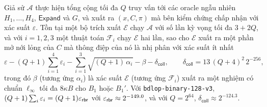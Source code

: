\begin{theorem}
\label{thm:bin-ks}
Giả sử $\mathcal A$ thực hiện tổng cộng tối đa $Q$ truy vấn tới các oracle ngẫu
nhiên $H_1,\dots,H_4$, $\mathsf{Expand}$ và $G$,
và xuất ra $(x,C,\pi)$ mà bên kiểm chứng chấp nhận với xác suất $\varepsilon$.
Tồn tại một bộ trích xuất $\mathcal E$ chạy $\mathcal A$ với số lần kỳ vọng tối
đa $3+2Q$, và với $i=1,2,3$ một thuật toán $\mathcal F_i$ chạy $\mathcal E$ hai
lần, sao cho $\mathcal E$ xuất ra một phần mở nới lỏng của $C$ mà thông điệp của
nó là nhị phân với xác suất ít nhất
\[
\varepsilon-(Q+1)\sum_{i=1}^{4}\varepsilon_i-\sum_{i=1}^{3}\sqrt{(Q+1)\,\alpha_i}
-\beta-\delta_{\mathsf{coll}},\qquad
\delta_{\mathsf{coll}}=13\,(Q+4)^2\,2^{-256},
\]
trong đó $\beta$ (tương ứng $\alpha_i$) là xác suất $\mathcal E$
(tương ứng $\mathcal F_i$) xuất ra một nghiệm \MSIS{} có chuẩn $\ell_\infty$ tối
đa $8\kappa B$ cho $B_1$ hoặc $B_1'$. Với
\texttt{bdlop-binary-128-v3}, $(Q+1)\sum_i\varepsilon_i=(Q+1)\varepsilon_{\mathsf{rbr}}$ với
$\varepsilon_{\mathsf{rbr}}\approx2^{-149.0}$, và với $Q=2^{64}$, $\delta_{\mathsf{coll}}\approx2^{-124.3}$.
\end{theorem}
